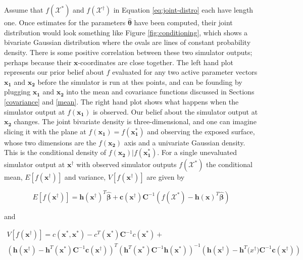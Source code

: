 \documentclass[
  12pt,
  a4paper,
  twoside]{book}
\begin{document}
Assume that \(f(\mathcal{X^*})\) and \(f(\mathcal{X^\dagger})\) in Equation \eqref{eq:joint-distro} each have length one. Once estimates for the parameters \(\mathbf{\hat{\theta}}\) have been computed, their joint distribution would look something like Figure \ref{fig:conditioning}, which shows a bivariate Gaussian distribution where the ovals are lines of constant probability density. There is some positive correlation between these two simulator outputs; perhaps because their \(\mathbf{x}\)-coordinates are close together. The left hand plot represents our prior belief about \(f\) evaluated for any two active parameter vectors \(\mathbf{x_1}\) and \(\mathbf{x_2}\) before the simulator is run at thes points, and can be founding by plugging \(\mathbf{x_1}\) and \(\mathbf{x_2}\) into the mean and covariance functions discussed in Sections \ref{covariance} and \ref{mean}. The right hand plot shows what happens when the simulator output at \(f(\mathbf{x_1})\) is observed. Our belief about the simulator output at \(\mathbf{x_2}\) changes. The joint bivariate density is three-dimensional, and one can imagine slicing it with the plane at \(f(\mathbf{x_1}) =f(\mathbf{x^*_1})\) and observing the exposed surface, whose two dimensions are the \(f(\mathbf{x_2})\) axis and a univariate Gaussian density. This is the conditional density of \(f(\mathbf{x_2})|f(\mathbf{x^*_1})\). For a single unevaluated simulator output at \(\mathbf{x^\dagger}\) with observed simulator outputs \(f(\mathcal{X^*})\) the conditional mean, \(E[f(\mathbf{x^\dagger})]\) and variance, \(V[f(\mathbf{x^\dagger})]\) are given by

\begin{equation}
\label{eq:pred-mean}
 E[f(\mathbf{x^\dagger})]= \mathbf{h}(\mathbf{x^\dagger})^T \hat{\mathbf{\beta}} + \mathbf{c}(\mathbf{x}^\dagger) \mathbf{C}^{-1} \left( f(\mathcal{X^*}) - \mathbf{h}(\mathbf{x})^T \hat{\mathbf{\beta}} \right)
\end{equation}

and

\begin{align}
\label{eq:pred-var}
V[f(\mathbf{x^\dagger})] = c(\mathbf{x^*}, \mathbf{x^*}) - c^T(\mathbf{x^*})\mathbf{C}^{-1} c(\mathbf{x^*}) +\\ \nonumber
\left( \mathbf{h}(\mathbf{x^\dagger}) - \mathbf{h}^T(\mathbf{x^*}) \mathbf{C}^{-1} \mathbf{c}(\mathbf{x^\dagger}) \right)^T \left( \mathbf{h}^T(\mathbf{\mathbf{x^*}}) \mathbf{C}^{-1} \mathbf{h}(\mathbf{x^*}) \right)^{-1} \left( \mathbf{h}(\mathbf{x^\dagger}) - \mathbf{h}^T \mathbf(x^\dagger) \mathbf{C}^{-1} \mathbf{c}(\mathbf{x^\dagger}) \right)
\end{align}
\end{document}
